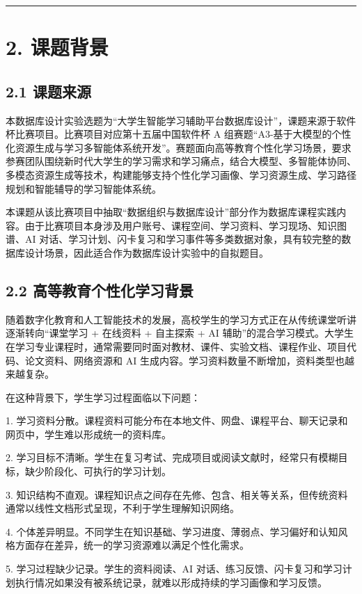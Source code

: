 \documentclass[10pt,a4paper,fontset=none]{ctexart}
\begin{document}
\bigskip\hrule\bigskip

\clearpage
\section*{2. 课题背景}

\subsection*{2.1 课题来源}

本数据库设计实验选题为“大学生智能学习辅助平台数据库设计”，课题来源于软件杯比赛项目。比赛项目对应第十五届中国软件杯 A 组赛题“A3-基于大模型的个性化资源生成与学习多智能体系统开发”。赛题面向高等教育个性化学习场景，要求参赛团队围绕新时代大学生的学习需求和学习痛点，结合大模型、多智能体协同、多模态资源生成等技术，构建能够支持个性化学习画像、学习资源生成、学习路径规划和智能辅导的学习智能体系统。\par

本课题从该比赛项目中抽取“数据组织与数据库设计”部分作为数据库课程实践内容。由于比赛项目本身涉及用户账号、课程空间、学习资料、学习现场、知识图谱、AI 对话、学习计划、闪卡复习和学习事件等多类数据对象，具有较完整的数据库设计场景，因此适合作为数据库设计实验中的自拟题目。\par

\subsection*{2.2 高等教育个性化学习背景}

随着数字化教育和人工智能技术的发展，高校学生的学习方式正在从传统课堂听讲逐渐转向“课堂学习 + 在线资料 + 自主探索 + AI 辅助”的混合学习模式。大学生在学习专业课程时，通常需要同时面对教材、课件、实验文档、课程作业、项目代码、论文资料、网络资源和 AI 生成内容。学习资料数量不断增加，资料类型也越来越复杂。\par

在这种背景下，学生学习过程面临以下问题：\par

1. 学习资料分散。课程资料可能分布在本地文件、网盘、课程平台、聊天记录和网页中，学生难以形成统一的资料库。\par
2. 学习目标不清晰。学生在复习考试、完成项目或阅读文献时，经常只有模糊目标，缺少阶段化、可执行的学习计划。\par
3. 知识结构不直观。课程知识点之间存在先修、包含、相关等关系，但传统资料通常以线性文档形式呈现，不利于学生理解知识网络。\par
4. 个体差异明显。不同学生在知识基础、学习进度、薄弱点、学习偏好和认知风格方面存在差异，统一的学习资源难以满足个性化需求。\par
5. 学习过程缺少记录。学生的资料阅读、AI 对话、练习反馈、闪卡复习和学习计划执行情况如果没有被系统记录，就难以形成持续的学习画像和学习反馈。\par
\end{document}
